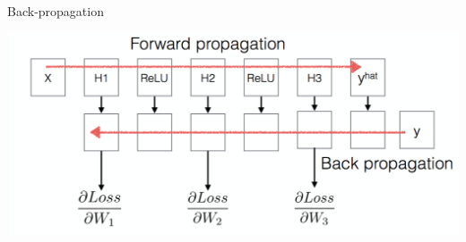 \documentclass[notes,12pt, aspectratio=169]{beamer}
\newenvironment{wideitemize}{\itemize\addtolength{\itemsep}{10pt}}{\enditemize}
\begin{document}
\begin{frame}{Back-propagation}
	\begin{center}
		\includegraphics[width=.8\linewidth]{backpropagation.png}
	\end{center}
\end{frame}

%
%		
%		
%		
%
%
%	
%	
%		
%	
\end{document}
